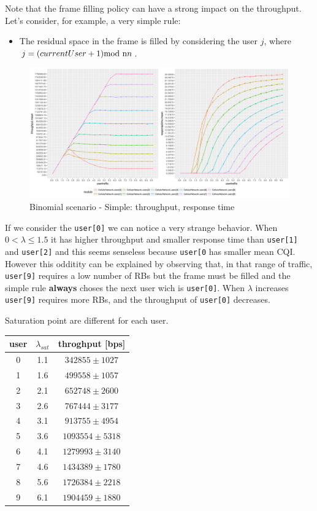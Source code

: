 Note that the frame filling policy can have a strong impact on the throughput. Let's consider, for example, a very simple rule: 
\begin{itemize}
\item The residual space in the frame is filled by considering the user \(j\), where \(j = (currentUser+1) \textnormal{mod n} n\).
\end{itemize}
\begin{figure}[H]
  \includegraphics[width=1\textwidth]{images/binom_old}
  \caption{Binomial scenario - Simple: throughput, response time}
  \label{fig:Binomial scenario - Simple: throughput, response time}
\end{figure}
If we consider the \texttt{user[0]} we can notice a very strange behavior. When \(0 < \lambda \leq 1.5\) it has higher throughput and smaller response time than \texttt{user[1]} and \texttt{user[2]} and this seems senseless because \texttt{user[0} has smaller mean CQI. However this odditity can be explained by observing that, in that range of traffic, \texttt{user[9]} requires a low number of RBs but the frame must be filled and the simple rule \textbf{always} choses the next user wich is \texttt{user[0]}. When \(\lambda\) increases \texttt{user[9]} requires more RBs, and the throughput of \texttt{user[0]} decreases.

Saturation point are different for each user.
\begin{center}
	\begin{tabular}{|c | c | c|}
	\hline
	 \textbf{user}  & \textbf{\(\lambda_{sat}\)}  & \textbf{throghput [bps]} \\ \hline
	 0 & 1.1 & $342855 \pm 1027$ \\ \hline
	 1 & 1.6 & $499558 \pm 1057$\\ \hline
	 2 & 2.1 & $652748 \pm 2600$\\ \hline
	 3 & 2.6 & $767444 \pm 3177$\\ \hline
	 4 & 3.1 & $913755 \pm 4954$\\ \hline
	 5 & 3.6 & $1093554 \pm 5318$\\ \hline
	 6 & 4.1 & $1279993 \pm 3140$\\ \hline
	 7 & 4.6 & $1434389 \pm 1780$ \\ \hline
	 8 & 5.6 & $1726384 \pm 2218$ \\ \hline
	 9 & 6.1 & $1904459 \pm 1880$ \\ \hline
	\end{tabular}
\end{center}